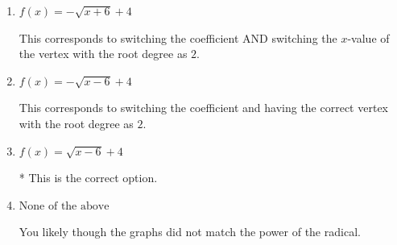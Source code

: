 \documentclass{extbook}[14pt]
\begin{document}
\begin{enumerate}
{\begin{enumerate}[label=\Alph*.]
This corresponds to the correct coefficient and switching the $x$-value of the vertex with the root degree as $2$.
\item \( f(x) = - \sqrt{x + 6} + 4 \)

This corresponds to switching the coefficient AND switching the $x$-value of the vertex with the root degree as $2$.
\item \( f(x) = - \sqrt{x - 6} + 4 \)

This corresponds to switching the coefficient and having the correct vertex with the root degree as $2$.
\item \( f(x) = \sqrt{x - 6} + 4 \)

* This is the correct option.
\item \( \text{None of the above} \)

You likely though the graphs did not match the power of the radical.
\end{enumerate}

}
\end{enumerate}
\end{document}
